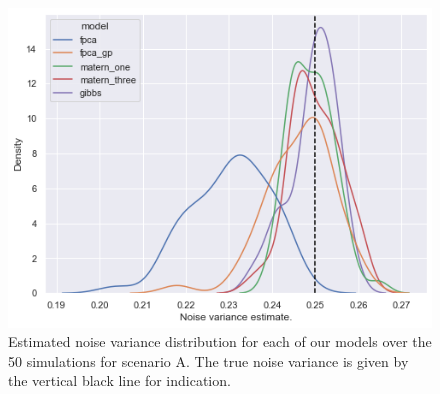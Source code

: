 \begin{figure}
	\centering
	\includegraphics[width=\textwidth]{noise_param_A}
	\caption[Estimated noise variance distribution for each of our models over the 50 simulations for scenario A.]{Estimated noise variance distribution for each of our models over the 50 simulations for scenario A. The true noise variance is given by the vertical black line for indication.}
		\label{fig:noise_param_A}
\end{figure}

